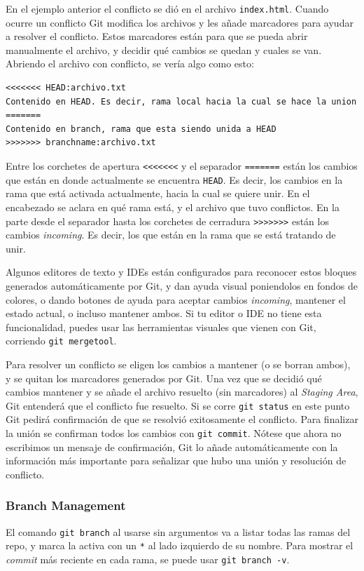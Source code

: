 \documentclass[spanish, 12pt, a4paper]{article}
\begin{document}
En el ejemplo anterior el conflicto se dió en el archivo \texttt{index.html}.
Cuando ocurre un conflicto Git modifica los archivos y les añade marcadores para ayudar a resolver el conflicto.
Estos marcadores están para que se pueda abrir manualmente el archivo, y decidir qué cambios se quedan y cuales se van.
Abriendo el archivo con conflicto, se vería algo como esto:
\begin{lstlisting}
<<<<<<< HEAD:archivo.txt
Contenido en HEAD. Es decir, rama local hacia la cual se hace la union
=======
Contenido en branch, rama que esta siendo unida a HEAD
>>>>>>> branchname:archivo.txt
\end{lstlisting}

Entre los corchetes de apertura \texttt{<<<<<<<} y el separador \texttt{=======} están los cambios que están en donde actualmente se encuentra \texttt{HEAD}.
Es decir, los cambios en la rama que está activada actualmente, hacia la cual se quiere unir.
En el encabezado se aclara en qué rama está, y el archivo que tuvo conflictos.
En la parte desde el separador hasta los corchetes de cerradura \texttt{>>>>>>>} están los cambios \textit{incoming}.
Es decir, los que están en la rama que se está tratando de unir.

Algunos editores de texto y IDEs están configurados para reconocer estos bloques generados automáticamente por Git, y dan ayuda visual poniendolos en fondos de colores, o dando botones de ayuda para aceptar cambios \textit{incoming}, mantener el estado actual, o incluso mantener ambos.
Si tu editor o IDE no tiene esta funcionalidad, puedes usar las herramientas visuales que vienen con Git, corriendo \texttt{git mergetool}.

Para resolver un conflicto se eligen los cambios a mantener (o se borran ambos), y se quitan los marcadores generados por Git.
Una vez que se decidió qué cambios mantener y se añade el archivo resuelto (sin marcadores) al \textit{Staging Area}, Git entenderá que el conflicto fue resuelto.
Si se corre \texttt{git status} en este punto Git pedirá confirmación de que se resolvió exitosamente el conflicto.
Para finalizar la unión se confirman todos los cambios con \texttt{git commit}.
Nótese que ahora no escribimos un mensaje de confirmación, Git lo añade automáticamente con la información más importante para señalizar que hubo una unión y resolución de conflicto.

\subsubsection{Branch Management}
El comando \texttt{git branch} al usarse sin argumentos va a listar todas las ramas del repo, y marca la activa con un \texttt{*} al lado izquierdo de su nombre.
Para mostrar el \textit{commit} más reciente en cada rama, se puede usar \texttt{git branch -v}.
\end{document}
